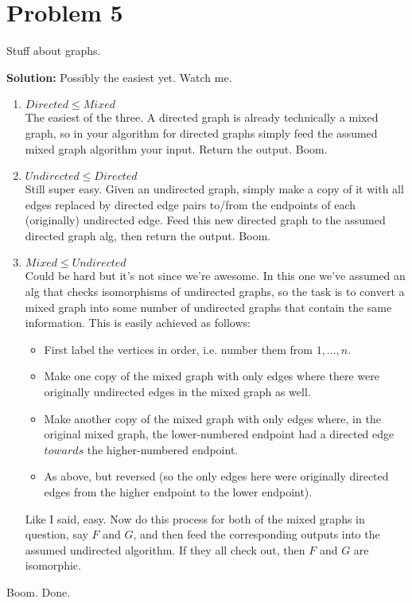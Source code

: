 \documentclass{article}
\providecommand{\prob}[1]{\section*{Problem #1}}
\providecommand{\soln}{\textbf{Solution: }}
\begin{document}
\prob{5}
Stuff about graphs.\par
\soln
Possibly the easiest yet. Watch me.
\begin{enumerate}
  \item $Directed \leq Mixed$\\
        The easiest of the three. A directed graph is already technically a mixed graph, so in your algorithm for directed graphs simply feed the assumed mixed graph algorithm your input. Return the output. Boom.
  \item $Undirected \leq Directed$\\
        Still super easy. Given an undirected graph, simply make a copy of it with all edges replaced by directed edge pairs to/from the endpoints of each (originally) undirected edge. Feed this new directed graph to the assumed directed graph alg, then return the output. Boom.
  \item $Mixed \leq Undirected$\\
        Could be hard but it's not since we're awesome. In this one we've assumed an alg that checks isomorphisms of undirected graphs, so the task is to convert a mixed graph into some number of undirected graphs that contain the same information. This is easily achieved as follows:
        \begin{itemize}
          \item First label the vertices in order, i.e. number them from $1,\dots,n$.
          \item Make one copy of the mixed graph with only edges where there were originally undirected edges in the mixed graph as well.
          \item Make another copy of the mixed graph with only edges where, in the original mixed graph, the lower-numbered endpoint had a directed edge $towards$ the higher-numbered endpoint.
          \item As above, but reversed (so the only edges here were originally directed edges from the higher endpoint to the lower endpoint).
        \end{itemize}
        Like I said, easy. Now do this process for both of the mixed graphs in question, say $F$ and $G$, and then feed the corresponding outputs into the assumed undirected algorithm. If they all check out, then $F$ and $G$ are isomorphic.
\end{enumerate}
Boom. Done.
\end{document}
